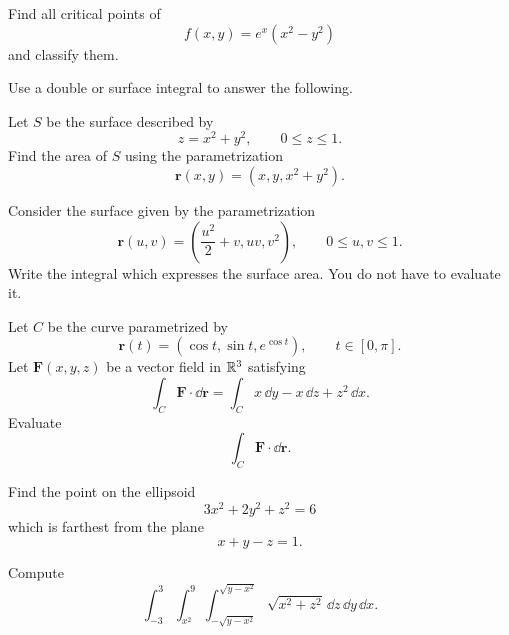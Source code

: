 \begin{problem}
Find all critical points of
\[
f(x, y)=e^x(x^2-y^2)
\]
and classify them.
\end{problem}

\begin{problem}
Use a double or surface integral to answer the following.
\begin{problemsubparts}
\item Let $S$ be the surface described by
\[
z=x^2+y^2,
\qquad
0\le z\le1.
\]
Find the area of $S$ using the parametrization
\[
\mathbf r(x, y)=(x, y, x^2+y^2).
\]
\item Consider the surface given by the parametrization
\[
\mathbf r(u, v)=\left(\frac{u^2}{2}+v, uv, v^2\right),
\qquad
0\le u, v\le1.
\]
Write the integral which expresses the surface area. You do not have to evaluate it.
\end{problemsubparts}
\end{problem}

\begin{problem}
Let $C$ be the curve parametrized by
\[
\mathbf r(t)=(\cos t, \sin t, e^{\cos t}),
\qquad
t\in[0, \pi].
\]
Let $\mathbf F(x, y, z)$ be a vector field in $\mathbb{R}^3$ satisfying
\[
\int_C\mathbf F\cdot\dd\mathbf r
=
\int_C x\,\dd y-x\,\dd z+z^2\,\dd x.
\]
Evaluate
\[
\int_C\mathbf F\cdot\dd\mathbf r.
\]
\end{problem}

\begin{problem}
Find the point on the ellipsoid
\[
3x^2+2y^2+z^2=6
\]
which is farthest from the plane
\[
x+y-z=1.
\]
\end{problem}

\begin{problem}
Compute
\[
\int_{-3}^{3}
\int_{x^2}^{9}
\int_{-\sqrt{y-x^2}}^{\sqrt{y-x^2}}
\sqrt{x^2+z^2}\,\dd z\,\dd y\,\dd x.
\]
\end{problem}

